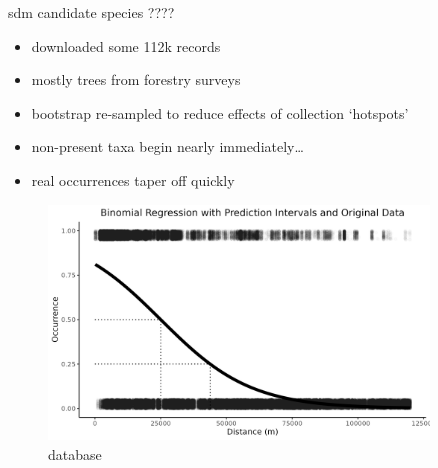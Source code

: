 \documentclass[
  ignorenonframetext,
]{beamer}
\providecommand{\tightlist}{%
  \setlength{\itemsep}{0pt}\setlength{\parskip}{0pt}}
\begin{document}
\begin{frame}{sdm candidate species ????}
\protect\hypertarget{sdm-candidate-species}{}
\begin{itemize}
\tightlist
\item
  downloaded some 112k records
\item
  mostly trees from forestry surveys
\item
  bootstrap re-sampled to reduce effects of collection `hotspots'
\item
  non-present taxa begin nearly immediately\ldots{}
\item
  real occurrences taper off quickly
\end{itemize}

\begin{figure}
\centering
\includegraphics[width=0.9\textwidth,height=\textheight]{../graphics/plots/Occurrence_distance.png}
\caption{database}
\end{figure}
\end{frame}
\end{document}
